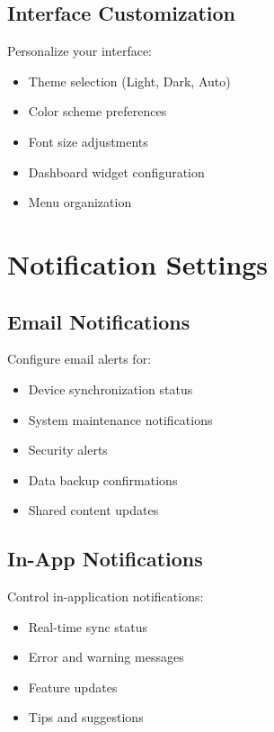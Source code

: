 \subsection{Interface Customization}

Personalize your interface:

\begin{itemize}
    \item Theme selection (Light, Dark, Auto)
    \item Color scheme preferences
    \item Font size adjustments
    \item Dashboard widget configuration
    \item Menu organization
\end{itemize}

\section{Notification Settings}

\subsection{Email Notifications}

Configure email alerts for:

\begin{itemize}
    \item Device synchronization status
    \item System maintenance notifications
    \item Security alerts
    \item Data backup confirmations
    \item Shared content updates
\end{itemize}

\subsection{In-App Notifications}

Control in-application notifications:

\begin{itemize}
    \item Real-time sync status
    \item Error and warning messages
    \item Feature updates
    \item Tips and suggestions
\end{itemize}

